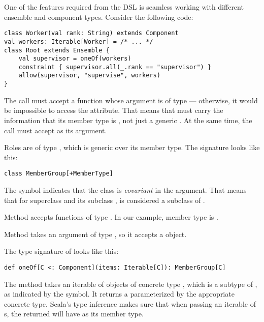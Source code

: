 One of the features required from the DSL is seamless working with different ensemble
and component types. Consider the following code:
\begin{lstlisting}[style=ensembles]
class Worker(val rank: String) extends Component
val workers: Iterable[Worker] = /* ... */
class Root extends Ensemble {
    val supervisor = oneOf(workers)
    constraint { supervisor.all(_.rank == "supervisor") }
    allow(supervisor, "supervise", workers)
}
\end{lstlisting}

The  call must accept a function whose argument is of type
 --- otherwise, it would be impossible to access the  attribute.
That means that  must carry the information that its member type is
, not just a generic . At the same time, the  call
must accept  as its argument.

\pagebreak
Roles are of type , which is generic over its member type. The signature
looks like this:
\begin{lstlisting}[style=snippet]
class MemberGroup[+MemberType]
\end{lstlisting}

The \dop{+} symbol indicates that the class is \textit{covariant} in the 
argument. That means that for superclass  and its subclass ,
 is considered a subclass of .

Method  accepts functions of type . In our
example, member type is .

Method  takes an argument of type , so it accepts
a  object.

The type signature of  looks like this:
\begin{lstlisting}[style=snippet]
def oneOf[C <: Component](items: Iterable[C]): MemberGroup[C]
\end{lstlisting}
The method takes an iterable of objects of concrete type , which is a subtype of
, as indicated by the \dop{<:} symbol. It returns a 
parameterized by the appropriate concrete type. Scala's type inference makes sure that
when passing an iterable of s, the returned  will have
 as its member type.

\medskip

